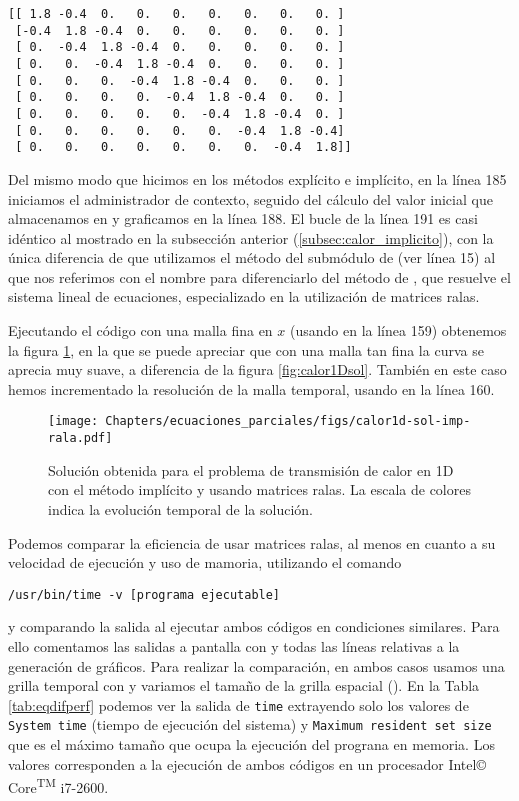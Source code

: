 \begin{verbatim}
[[ 1.8 -0.4  0.   0.   0.   0.   0.   0.   0. ]
 [-0.4  1.8 -0.4  0.   0.   0.   0.   0.   0. ]
 [ 0.  -0.4  1.8 -0.4  0.   0.   0.   0.   0. ]
 [ 0.   0.  -0.4  1.8 -0.4  0.   0.   0.   0. ]
 [ 0.   0.   0.  -0.4  1.8 -0.4  0.   0.   0. ]
 [ 0.   0.   0.   0.  -0.4  1.8 -0.4  0.   0. ]
 [ 0.   0.   0.   0.   0.  -0.4  1.8 -0.4  0. ]
 [ 0.   0.   0.   0.   0.   0.  -0.4  1.8 -0.4]
 [ 0.   0.   0.   0.   0.   0.   0.  -0.4  1.8]]
\end{verbatim}

Del mismo modo que hicimos en los métodos explícito e implícito, en la línea 185 iniciamos el administrador de contexto, seguido del cálculo del valor inicial que almacenamos en  y graficamos en la línea 188. El bucle  de la línea 191 es casi idéntico al mostrado en la subsección anterior (\ref{subsec:calor_implicito}), con la única diferencia de que utilizamos el método  del submódulo  de  (ver línea 15) al que nos referimos con el nombre  para diferenciarlo del método  de , que resuelve el sistema lineal de ecuaciones, especializado en la utilización de matrices ralas.

Ejecutando el código con una malla fina en $x$ (usando  en la línea 159) obtenemos la figura \ref{fig:calor1Dsol-imp-rala}, en la que se puede apreciar que con una malla tan fina la curva se aprecia muy suave, a diferencia de la figura \ref{fig:calor1Dsol}. También en este caso hemos incrementado la resolución de la malla temporal, usando  en la línea 160.

\begin{figure}[ht]
 \centering
 \texttt{[image: Chapters/ecuaciones\_parciales/figs/calor1d-sol-imp-rala.pdf]}
 \caption{Solución obtenida para el problema de transmisión de calor en 1D con el método implícito y usando matrices ralas. La escala de colores indica la evolución temporal de la solución.}
 \label{fig:calor1Dsol-imp-rala}
\end{figure}


Podemos comparar la eficiencia de usar matrices ralas, al menos en cuanto a su velocidad de ejecución y uso de mamoria, utilizando el comando 
\begin{verbatim}
/usr/bin/time -v [programa ejecutable]
\end{verbatim}
y comparando la salida al ejecutar ambos códigos en condiciones similares. Para ello comentamos las salidas a pantalla con  y todas las líneas relativas a la generación de gráficos. Para realizar la comparación, en ambos casos usamos una grilla temporal con  y variamos el tamaño de la grilla espacial (). En la Tabla \ref{tab:eqdifperf} podemos ver la salida de \verb|time| extrayendo solo los valores de \verb|System time| (tiempo de ejecución del sistema) y \verb|Maximum resident set size| que es el máximo tamaño que ocupa la ejecución del prograna en memoria. Los valores corresponden a la ejecución de ambos códigos en un procesador Intel© Core\textsuperscript{TM} i7-2600. 

